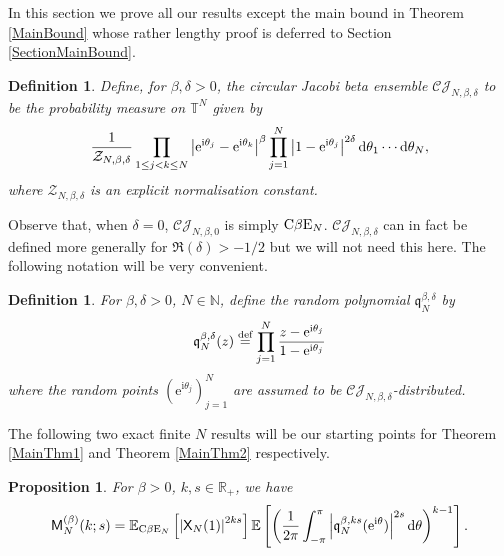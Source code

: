 \documentclass[]{article}
\newtheorem{defn}[thm]{Definition}
\newtheorem{prop}[thm]{Proposition}
\begin{document}
In this section we prove all our results except the main bound in Theorem \ref{MainBound} whose rather lengthy proof is deferred to Section \ref{SectionMainBound}.

\begin{defn}\label{CJbetaEdef}
Define, for $\beta,\delta>0$, the circular Jacobi beta ensemble $\mathcal{CJ}_{N,\beta,\delta}$ to be the probability measure on $\mathbb{T}^N$ given by
\begin{equation*}
\frac{1}{\mathcal{Z}_{N,\beta,\delta}}\prod_{1\le j <k \le N} \left|\mathrm{e}^{\textnormal{i}\theta_j}-\mathrm{e}^{\textnormal{i}\theta_k}\right|^\beta \prod_{j=1}^N \left|1-\mathrm{e}^{\textnormal{i}\theta_j}\right|^{2\delta}\mathrm{d}\theta_1\cdots \mathrm{d}\theta_N,
\end{equation*} 
where $\mathcal{Z}_{N,\beta,\delta}$ is an explicit normalisation constant.
\end{defn}
Observe that, when $\delta=0$, $\mathcal{CJ}_{N,\beta,0}$ is simply $\textnormal{C}\beta \textnormal{E}_N$. $\mathcal{CJ}_{N,\beta,\delta}$ can in fact be defined more generally for $\Re(\delta)>-1/2$ but we will not need this here.  The following notation will be very convenient.

\begin{defn}\label{DefNormalisedChar}
For $\beta,\delta>0$, $N \in \mathbb{N}$, define the random polynomial $\mathfrak{q}^{\beta,\delta}_N$ by
\begin{equation}
\mathfrak{q}^{\beta,\delta}_N(z)\overset{\textnormal{def}}{=}\prod_{j=1}^N \frac{z-\mathrm{e}^{\mathrm{i}\theta_j}}{1-\mathrm{e}^{\mathrm{i}\theta_j}}
\end{equation}
where the random points $(\mathrm{e}^{\mathrm{i}\theta_j})_{j=1}^N$  are assumed to be $\mathcal{CJ}_{N,\beta,\delta}$-distributed.  
\end{defn}


The following two exact finite $N$ results will be our starting points for Theorem \ref{MainThm1} and Theorem \ref{MainThm2} respectively. 

\begin{prop}\label{MoMrep}
For $\beta>0$, $k,s \in \mathbb{R}_+$, we have
\begin{equation*}
\mathsf{M}^{(\beta)}_N(k;s)=\mathbb{E}_{\textnormal{C}\beta \textnormal{E}_N}\left[\left|\mathsf{X}_N(1)\right|^{2ks}\right] \mathbb{E}\left[\left(\frac{1}{2\pi}\int_{-\pi}^\pi \left|\mathfrak{q}_N^{\beta,ks}(\mathrm{e}^{\mathrm{i}\theta})\right|^{2s}\mathrm{d}\theta\right)^{k-1}\right].
\end{equation*}
\end{prop}
\end{document}
